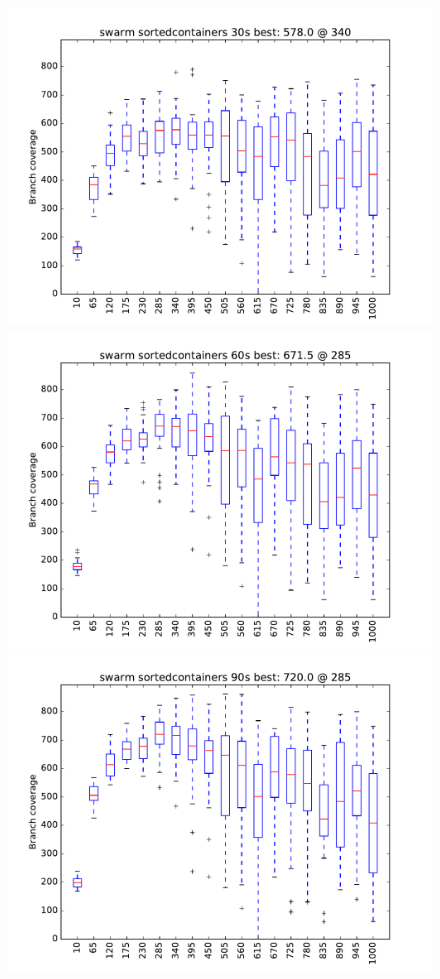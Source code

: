 \begin{figure}
\includegraphics[width=\columnwidth]{graphs/sortedcontainersswarm30}
\includegraphics[width=\columnwidth]{graphs/sortedcontainersswarm60}
\includegraphics[width=\columnwidth]{graphs/sortedcontainersswarm90}
\end{figure}


